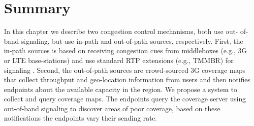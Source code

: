 \section{Summary}

In this chapter we describe two congestion control mechanisms, both use out-
of-band signaling, but use in-path and out-of-path sources, respectively.
First, the in-path sources is based on receiving congestion cues from
middleboxes (e.g., 3G or LTE base-stations) and use standard RTP extensions
(e.g., TMMBR) for signaling . Second, the out-of-path sources are 
crowd-sourced 3G coverage maps that collect throughput and geo-location information
from users and then notifies endpoints about the available capacity in the
region. We propose a system to collect and query coverage maps. The endpoints
query the coverage server using out-of-band signaling to discover areas of
poor coverage, based on these notifications the endpoints vary their sending
rate.
